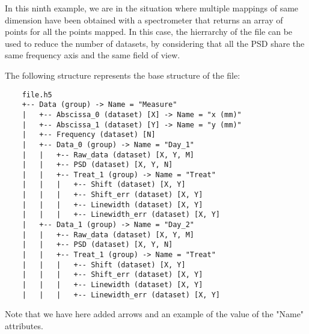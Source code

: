 In this ninth example, we are in the situation where multiple mappings of same dimension have been obtained with a spectrometer that returns an array of points for all the points mapped. In this case, the hierrarchy of the file can be used to reduce the number of datasets, by considering that all the PSD share the same frequency axis and the same field of view.

The following structure represents the base structure of the file:
\begin{verbatim}
    file.h5
    +-- Data (group) -> Name = "Measure"
    |   +-- Abscissa_0 (dataset) [X] -> Name = "x (mm)"
    |   +-- Abscissa_1 (dataset) [Y] -> Name = "y (mm)"
    |   +-- Frequency (dataset) [N]
    |   +-- Data_0 (group) -> Name = "Day_1"
    |   |   +-- Raw_data (dataset) [X, Y, M]
    |   |   +-- PSD (dataset) [X, Y, N]
    |   |   +-- Treat_1 (group) -> Name = "Treat"
    |   |   |   +-- Shift (dataset) [X, Y]
    |   |   |   +-- Shift_err (dataset) [X, Y]
    |   |   |   +-- Linewidth (dataset) [X, Y]
    |   |   |   +-- Linewidth_err (dataset) [X, Y]
    |   +-- Data_1 (group) -> Name = "Day_2"
    |   |   +-- Raw_data (dataset) [X, Y, M]
    |   |   +-- PSD (dataset) [X, Y, N]
    |   |   +-- Treat_1 (group) -> Name = "Treat"
    |   |   |   +-- Shift (dataset) [X, Y]
    |   |   |   +-- Shift_err (dataset) [X, Y]
    |   |   |   +-- Linewidth (dataset) [X, Y]
    |   |   |   +-- Linewidth_err (dataset) [X, Y]
\end{verbatim}
Note that we have here added arrows and an example of the value of the "Name" attributes.